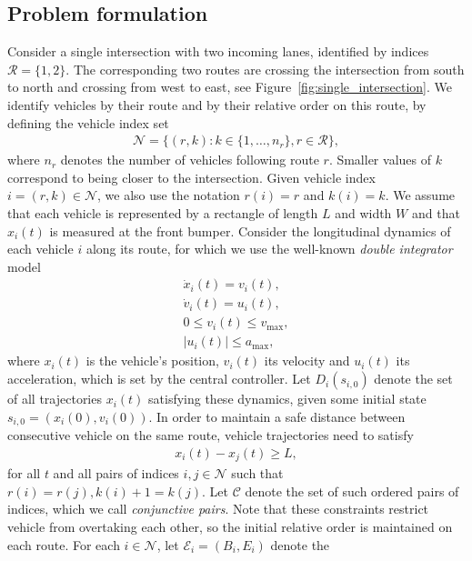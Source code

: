 \documentclass{article}
\theoremstyle{definition}
\theoremstyle{plain}
\begin{document}
\subsection{Problem formulation}

Consider a single intersection with two incoming lanes, identified by indices
$\mathcal{R} = \{ 1, 2 \}$. The corresponding two routes are crossing the
intersection from south to north and crossing from west to east, see
Figure~\ref{fig:single_intersection}. We identify vehicles by their route and by
their relative order on this route, by defining the vehicle index set
\begin{align*}
  \mathcal{N} = \{ (r, k) : k \in \{1, \dots, n_{r}\}, r \in \mathcal{R}\} ,
\end{align*}
where $n_{r}$ denotes the number of vehicles following route $r$. Smaller values
of $k$ correspond to being closer to the intersection. Given vehicle index
$i = (r, k) \in \mathcal{N}$, we also use the notation $r(i) = r$ and $k(i) = k$.
%
We assume that each vehicle is represented by a rectangle of length $L$ and
width $W$ and that $x_{i}(t)$ is measured at the front bumper.
%
Consider the longitudinal dynamics of each vehicle $i$ along its route, for
which we use the well-known \textit{double integrator} model
\begin{align*}
  \dot{x}_{i}(t) = v_{i}(t) , \\
  \dot{v}_{i}(t) = u_{i}(t)  , \\
  0 \leq v_{i}(t) \leq v_{\max} , \\
  |u_{i}(t) | \leq a_{\max} ,
\end{align*}
where $x_{i}(t)$ is the vehicle's position, $v_{i}(t)$ its velocity and
$u_{i}(t)$ its acceleration, which is set by the central controller. Let
$D_{i}(s_{i,0})$ denote the set of all trajectories $x_{i}(t)$ satisfying these
dynamics, given some initial state $s_{i,0} = (x_{i}(0), v_{i}(0))$.
%
In order to
maintain a safe distance between consecutive vehicle on the same route, vehicle
trajectories need to satisfy
\begin{align*}
  x_{i}(t) - x_{j}(t) \geq L ,
\end{align*}
for all $t$ and all pairs of indices $i, j \in \mathcal{N}$ such that
$r(i) = r(j), k(i) + 1 = k(j)$. Let $\mathcal{C}$ denote the set of such ordered
pairs of indices, which we call \textit{conjunctive pairs}. Note that these
constraints restrict vehicle from overtaking each other, so the initial relative
order is maintained on each route.
%
For each $i \in \mathcal{N}$, let $\mathcal{E}_{i} = (B_{i}, E_{i})$ denote the
\end{document}
